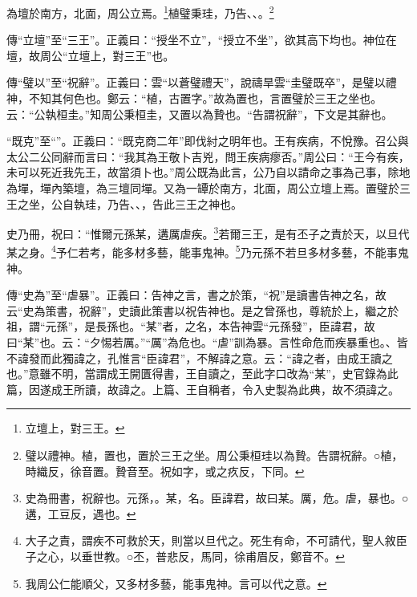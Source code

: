 為壇於南方，北面，周公立焉。\footnote{立壇上，對三王。}植璧秉珪，乃告、、。\footnote{璧以禮神。植，置也，置於三王之坐。周公秉桓珪以為贄。告謂祝辭。○植，時織反，徐音置。贄音至。祝如字，或之疚反，下同。}

{\noindent\zhuan{}\fzbyks 傳“立壇”至“三王”。正義曰：“授坐不立”，“授立不坐”，欲其高下均也。神位在壇，故周公“立壇上，對三王”也。 \par}

{\noindent\zhuan{}\fzbyks 傳“璧以”至“祝辭”。正義曰：雲“以蒼璧禮天”，說禱旱雲“圭璧既卒”，是璧以禮神，不知其何色也。鄭云：“植，古置字。”故為置也，言置璧於三王之坐也。云：“公執桓圭。”知周公秉桓圭，又置以為贄也。“告謂祝辭”，下文是其辭也。 \par}

{\noindent\shu{}\fzkt “既克”至“”。正義曰：“既克商二年”即伐紂之明年也。王有疾病，不悅豫。召公與太公二公同辭而言曰：“我其為王敬卜吉兇，問王疾病瘳否。”周公曰：“王今有疾，未可以死近我先王，故當須卜也。”周公既為此言，公乃自以請命之事為己事，除地為墠，墠內築壇，為三壇同墠。又為一罈於南方，北面，周公立壇上焉。置璧於三王之坐，公自執珪，乃告、、，告此三王之神也。 \par}

史乃冊，祝曰：“惟爾元孫某，遘厲虐疾。\footnote{史為冊書，祝辭也。元孫，。某，名。臣諱君，故曰某。厲，危。虐，暴也。○遘，工豆反，遇也。}若爾三王，是有丕子之責於天，以旦代某之身。\footnote{大子之責，謂疾不可救於天，則當以旦代之。死生有命，不可請代，聖人敘臣子之心，以垂世教。○丕，普悲反，馬同，徐甫眉反，鄭音不。}予仁若考，能多材多藝，能事鬼神。\footnote{我周公仁能順父，又多材多藝，能事鬼神。言可以代之意。}乃元孫不若旦多材多藝，不能事鬼神。


{\noindent\zhuan{}\fzbyks 傳“史為”至“虐暴”。正義曰：告神之言，書之於策，“祝”是讀書告神之名，故云“史為策書，祝辭”，史讀此策書以祝告神也。是之曾孫也，尊統於上，繼之於祖，謂“元孫”，是長孫也。“某”者，之名，本告神雲“元孫發”，臣諱君，故曰“某”也。云：“夕惕若厲。”“厲”為危也。“虐”訓為暴。言性命危而疾暴重也。、皆不諱發而此獨諱之，孔惟言“臣諱君”，不解諱之意。云：“諱之者，由成王讀之也。”意雖不明，當謂成王開匱得書，王自讀之，至此字口改為“某”，史官錄為此篇，因遂成王所讀，故諱之。上篇、王自稱者，令入史製為此典，故不須諱之。 \par}

